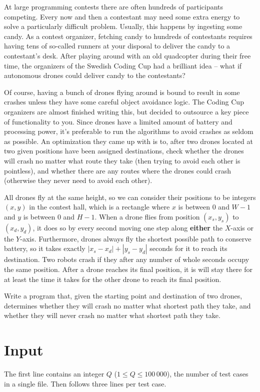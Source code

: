 At large programming contests there are often hundreds of participants competing.
Every now and then a contestant may need some extra energy to solve a particularly difficult problem.
Usually, this happens by ingesting some candy.
As a contest organizer, fetching candy to hundreds of contestants requires having tens of so-called runners at your disposal to deliver the candy to a contestant's desk.
After playing around with an old quadcopter during their free time, the organizers of the Swedish Coding Cup had a brilliant idea -- what if autonomous drones could deliver candy to the contestants?

Of course, having a bunch of drones flying around is bound to result in some crashes unless they have some careful object avoidance logic.
The Coding Cup organizers are almost finished writing this, but decided to outsource a key piece of functionality to you.
Since drones have a limited amount of battery and processing power, it's preferable to run the algorithms to avoid crashes as seldom as possible.
An optimization they came up with is to, after two drones located at two given positions have been assigned destinations, check whether the drones will crash no matter what route they take (then trying to avoid each other is pointless), and whether there are any routes where the drones could crash (otherwise they never need to avoid each other).

All drones fly at the same height, so we can consider their positions to be integers $(x, y)$ in the contest hall, which is a rectangle where $x$ is between $0$ and $W - 1$ and $y$ is between $0$ and $H - 1$.
When a drone flies from position $(x_s, y_s)$ to $(x_d, y_d)$, it does so by every second moving one step along \textbf{either} the $X$-axis or the $Y$-axis.
Furthermore, drones always fly the shortest possible path to conserve battery, so it takes exactly $|x_s - x_d| + |y_s - y_d|$ seconds for it to reach its destination.
Two robots crash if they after any number of whole seconds occupy the same position.
After a drone reaches its final position, it is will stay there for at least the time it takes for the other drone to reach its final position.

Write a program that, given the starting point and destination of two drones, determines whether they will crash no matter what shortest path they take, and whether they will never crash no matter what shortest path they take.

\section*{Input}
The first line contains an integer $Q$ ($1 \le Q \le 100\,000$), the number of test cases in a single file.
Then follows three lines per test case.

